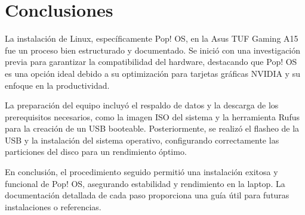 \section{Conclusiones}

La instalación de Linux, específicamente Pop! OS, en la Asus TUF Gaming A15 fue un proceso bien estructurado y documentado. Se inició con una investigación previa para garantizar la compatibilidad del hardware, destacando que Pop! OS es una opción ideal debido a su optimización para tarjetas gráficas NVIDIA y su enfoque en la productividad.

La preparación del equipo incluyó el respaldo de datos y la descarga de los prerequisitos necesarios, como la imagen ISO del sistema y la herramienta Rufus para la creación de un USB booteable. Posteriormente, se realizó el flasheo de la USB y la instalación del sistema operativo, configurando correctamente las particiones del disco para un rendimiento óptimo.

En conclusión, el procedimiento seguido permitió una instalación exitosa y funcional de Pop! OS, asegurando estabilidad y rendimiento en la laptop. La documentación detallada de cada paso proporciona una guía útil para futuras instalaciones o referencias.
